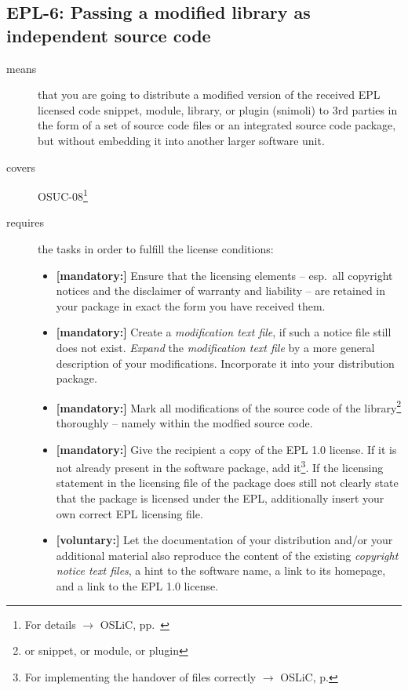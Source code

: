 \subsection{EPL-6: Passing a modified library as independent source code}
\label{OSUC-08-EPL}

\begin{description}
\item[means] that you are going to distribute a modified version of the received
EPL licensed code snippet, module, library, or plugin (snimoli) to 3rd
parties in the form of a set of source code files or an integrated source code
package, but without embedding it into another larger software unit.
\item[covers] OSUC-08\footnote{For details $\rightarrow$ OSLiC, pp.\ \pageref{OSUC-08-DEF}}
\item[requires] the tasks in order to fulfill the license conditions:
\begin{itemize}

  \item \textbf{[mandatory:]} Ensure that the licensing elements -- esp.\ all
  copyright notices and the disclaimer of warranty and liability -- are retained
  in your package in exact the form you have received them.

  \item \textbf{[mandatory:]} Create a \emph{modification text file}, if such a
  notice file still does not exist. \emph{Expand} the \emph{modification text
  file} by a more general description of your modifications. Incorporate it into
  your distribution package.

  \item \textbf{[mandatory:]} Mark all modifications of the source code of the
  library\footnote{or snippet, or module, or plugin} thoroughly -- namely within
  the modfied source code.
  
  \item \textbf{[mandatory:]} Give the recipient a copy of the EPL 1.0 license.
  If it is not already present in the software package, add it\footnote{For
  implementing the handover of files correctly $\rightarrow$ OSLiC, p.
  \pageref{DistributingFilesHint}}. If the licensing statement in the licensing
  file of the package does still not clearly state that the package is licensed
  under the EPL, additionally insert your own correct EPL licensing file.  
  
  \item \textbf{[voluntary:]} Let the documentation of your distribution and/or
  your additional material  also reproduce the content of the existing
  \emph{copyright notice text files}, a hint to the software name, a link to its
  homepage, and a link to the EPL 1.0 license.


\end{itemize}
\end{description}
